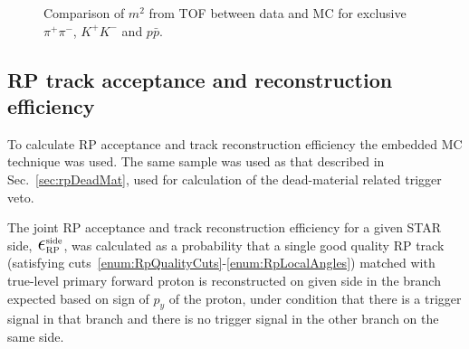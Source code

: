 \begin{figure}[ht!]
{\begin{subfigure}[b]{\linewidth}{
                }
  \end{subfigure}
}
\quad
\parbox{0.315\textwidth}{
  \centering
  \begin{subfigure}[b]{\linewidth}{
                }
  \end{subfigure}
}%
\caption{Comparison of $m^{2}$ from TOF between data and MC for exclusive $\pi^{+}\pi^{-}$, $K^{+}K^{-}$ and $p\bar{p}$.}
\end{figure}









\subsection{RP track acceptance and reconstruction efficiency}\label{sec:rpAccAndEff}

To calculate RP acceptance and track reconstruction efficiency the embedded MC technique was used. The same sample was used as that described in Sec.~\ref{sec:rpDeadMat}, used for calculation of the dead-material related trigger veto.

The joint RP acceptance and track reconstruction efficiency for a given STAR side, $\mbox{\LARGE$\epsilon$}_{\text{RP}}^{\text{side}}$, was calculated as a probability that a single good quality RP track (satisfying cuts~\ref{enum:RpQualityCuts}-\ref{enum:RpLocalAngles}) matched with true-level primary forward proton is reconstructed on given side in the branch expected based on sign of $p_{y}$ of the proton, under condition that there is a trigger signal in that branch and there is no trigger signal in the other branch on the same side.

